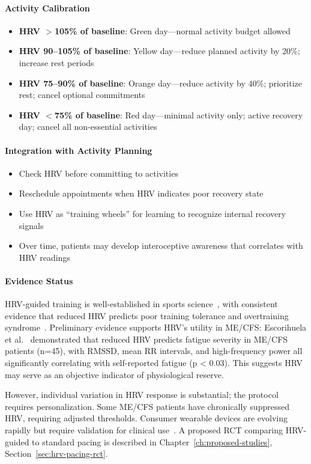 \begin{protocol}
\paragraph{Activity Calibration}
\begin{itemize}
    \item \textbf{HRV $>$105\% of baseline}: Green day---normal activity budget allowed
    \item \textbf{HRV 90--105\% of baseline}: Yellow day---reduce planned activity by 20\%; increase rest periods
    \item \textbf{HRV 75--90\% of baseline}: Orange day---reduce activity by 40\%; prioritize rest; cancel optional commitments
    \item \textbf{HRV $<$75\% of baseline}: Red day---minimal activity only; active recovery day; cancel all non-essential activities
\end{itemize}

\paragraph{Integration with Activity Planning}
\begin{itemize}
    \item Check HRV before committing to activities
    \item Reschedule appointments when HRV indicates poor recovery state
    \item Use HRV as ``training wheels'' for learning to recognize internal recovery signals
    \item Over time, patients may develop interoceptive awareness that correlates with HRV readings
\end{itemize}

\paragraph{Evidence Status}
HRV-guided training is well-established in sports science~\cite{Plews2013hrv,Addleman2024hrv}, with consistent evidence that reduced HRV predicts poor training tolerance and overtraining syndrome~\cite{Meeusen2013overtraining}. Preliminary evidence supports HRV's utility in ME/CFS: Escorihuela et al.~\cite{Escorihuela2020hrv} demonstrated that reduced HRV predicts fatigue severity in ME/CFS patients (n=45), with RMSSD, mean RR intervals, and high-frequency power all significantly correlating with self-reported fatigue (p < 0.03). This suggests HRV may serve as an objective indicator of physiological reserve.

However, individual variation in HRV response is substantial; the protocol requires personalization. Some ME/CFS patients have chronically suppressed HRV, requiring adjusted thresholds. Consumer wearable devices are evolving rapidly but require validation for clinical use~\cite{Li2023wearable}. A proposed RCT comparing HRV-guided to standard pacing is described in Chapter~\ref{ch:proposed-studies}, Section~\ref{sec:hrv-pacing-rct}.
\end{protocol}

